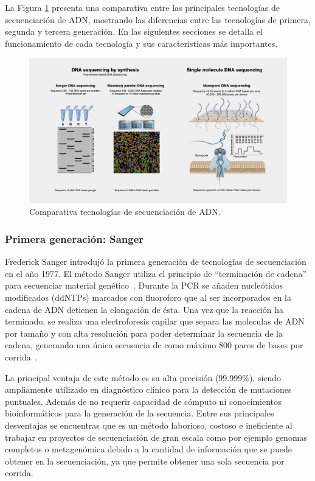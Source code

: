 La Figura \ref{fig:DNA_sequencing} presenta una comparativa entre las principales tecnologías de secuenciación de ADN, mostrando las diferencias entre las tecnologías de primera, segunda y tercera generación. En las siguientes secciones se detalla el funcionamiento de cada tecnología y sus caracteristicas más importantes.
\begin{figure}[H]
    \centering
    \includegraphics[width=1\linewidth]{images/DNA-Sequencing.jpg}
    \caption[Comparativa tecnologías de secuenciación]{Comparativa tecnologías de secuenciación de ADN\protect\footnotemark.}
    \label{fig:DNA_sequencing}
\end{figure}
\subsubsection{Primera generación: Sanger}
Frederick Sanger introdujó la primera generación de tecnologías de secuenciación en el año 1977. El método Sanger utiliza el principio de ``terminación de cadena'' para secuenciar material genético~\cite{sanger1975rapid}. 
Durante la PCR se añaden nucleótidos modificados (ddNTPs) marcados con fluoroforo que al ser incorporados en la cadena de ADN detienen la elongación de ésta. Una vez que la reacción ha terminado, se realiza una electroforesis capilar que separa las moleculas de ADN por tamaño y con alta resolución para poder determinar la secuencia de la cadena, generando una única secuencia de como máximo 800 pares de bases por corrida~\cite{crossley2020guidelines}.

La principal ventaja de este método es su alta precisión (99.999\%), siendo ampliamente utilizado en diagnóstico clínico para la detección de mutaciones puntuales. Además de no requerir capacidad de cómputo ni conocimientos bioinformáticos para la generación de la secuencia.  
Entre sus principales desventajas se encuentras que es un método laborioso, costoso e ineficiente al trabajar en proyectos de secuenciación de gran escala como por ejemplo genomas completos o metagenómica debido a la cantidad de información que se puede obtener en la secuenciación, ya que permite obtener una sola secuencia por corrida.
 
